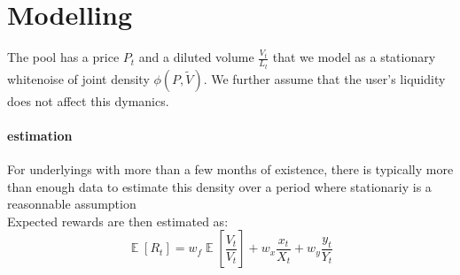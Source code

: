 \documentclass[12pt]{article}
\DeclareMathOperator*{\E}{\mathbb{E}}
\begin{document}
\section{Modelling}
The pool has a price $P_t$ and a diluted volume $\frac{V_t}{L_t}$ that we model as a stationary whitenoise of joint density $\phi(P, \tilde{V})$.
\newline \indent We further assume that the user's liquidity does not affect this dymanics.
\paragraph*{estimation}
For underlyings with more than a few months of existence, there is typically more than enough data to estimate this density over a period where stationariy is a reasonnable assumption\\
Expected rewards are then estimated as:
\begin{equation}
\E[R_t] = w_f \E[\frac{V_t}{V_t}] + w_x \frac{x_t}{X_t} + w_y \frac{y_t}{Y_t}
\end{equation}
\end{document}

